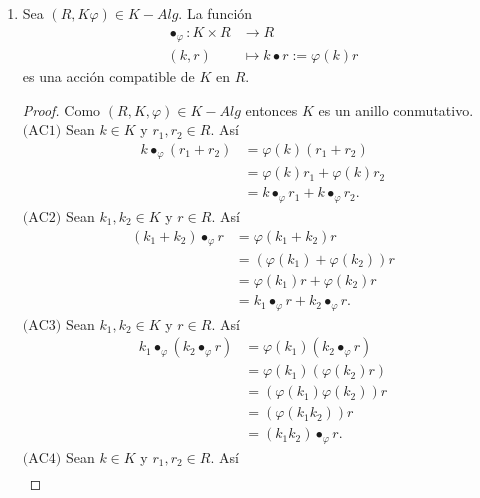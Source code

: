 \documentclass{article}
\newcommand{\lrprth}[1]{
    \left(#1\right)
}
\newcommand{\descapp}[6]{
    #1: #2 &\rightarrow #3\\
    #4 &\mapsto #5#6 
}
\theoremstyle{definition}
\theoremstyle{plain}
\theoremstyle{plain}
\theoremstyle{definition}
\theoremstyle{definition}
\theoremstyle{definition}
\theoremstyle{definition}
\theoremstyle{definition}
\theoremstyle{definition}
\begin{document}
\begin{enumerate}[label=\textbf{Ej \arabic*.}]
\begin{proof}
$\boxed{\cdot\cdot\cdot)\Rightarrow \cdot)}$\quad Si $R$ es conmutativo, entonces $\forall x,a\in R\quad xa=ax=x*a$ .
Además, como $R$ y $R^{op}$ coinciden como grupos abelianos, entonces \\
$R=R^{op}$ como anillos.
\end{proof}

    \item Sea $\lrprth{R,K\varphi}\in K-Alg$. La función 
    \begin{align*}
        \descapp{\bullet_\varphi}{K\times R}{R}{(k,r)}{k\bullet r:=\varphi\lrprth{k}r}{}
    \end{align*}
    es una acción compatible de $K$ en $R$.
    \begin{proof}
    Como $\lrprth{R,K,\varphi}\in K-Alg$ entonces $K$ es un anillo conmutativo.\\
    $\boxed{\text{(AC1)}}$ Sean $k\in K$ y $r_1,r_2\in R$. Así
    \begin{align*}
        k\bullet_\varphi\lrprth{r_1+r_2}&=\varphi\lrprth{k}\lrprth{r_1+r_2}\\
        &=\varphi\lrprth{k}r_1+\varphi\lrprth{k}r_2\\
        &=k\bullet_\varphi r_1+k\bullet_\varphi r_2.
    \end{align*}
    $\boxed{\text{(AC2)}}$ Sean $k_1,k_2\in K$ y $r\in R$. Así
    \begin{align*}
        \lrprth{k_1+k_2}\bullet_\varphi r&=\varphi\lrprth{k_1+k_2}r\\
        &=\lrprth{\varphi(k_1)+\varphi(k_2)}r\\
        &=\varphi(k_1)r+\varphi(k_2)r\\
        &=k_1\bullet_\varphi r+k_2\bullet_\varphi r.
    \end{align*}
    $\boxed{\text{(AC3)}}$ Sean $k_1,k_2\in K$ y $r\in R$. Así
    \begin{align*}
        k_1\bullet_\varphi\lrprth{k_2\bullet_\varphi r}&=\varphi\lrprth{k_1}\lrprth{k_2\bullet_\varphi r}\\
        &=\varphi\lrprth{k_1}\lrprth{\varphi\lrprth{k_2}r}\\
        &=\lrprth{\varphi\lrprth{k_1}\varphi\lrprth{k_2}}r\\
        &=\lrprth{\varphi\lrprth{k_1k_2}}r\\
        &=\lrprth{k_1k_2}\bullet_\varphi r.
    \end{align*}
     $\boxed{\text{(AC4)}}$ Sean $k\in K$ y $r_1,r_2\in R$. Así
    \begin{align*}

\end{align*}
\end{proof}
\end{enumerate}
\end{document}
